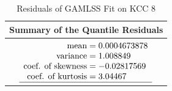 

\begin{table}[H]
\centering
\begin{tabular}{c}
\hline
\rowcolor{white} 
\textbf{Summary of the Quantile Residuals} \\ \hline\hline
 $\begin{array}[t]{ r @{{}={}} l }
\text{mean} & 0.0004673878                          \\ 
\text{variance} & 1.008849                          \\ 
\text{coef. of skewness} & -0.02817569              \\ 
\text{coef. of kurtosis} & 3.04467                 \\ \hline
\end{array}$
\end{tabular}
\caption{Residuals of GAMLSS Fit on KCC 8}
\label{tab:gamlss_residuals_kcc_8}
\end{table}





